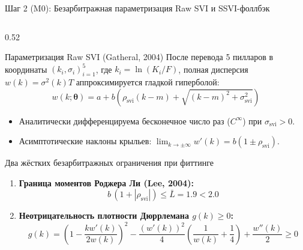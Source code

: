 \documentclass[aspectratio=169, 9pt]{beamer}
\begin{document}
\begin{frame}{Шаг 2 (M0): Безарбитражная параметризация Raw SVI и SSVI-фоллбэк}
  \begin{columns}[T]
    \begin{column}{0.52\textwidth}
      \begin{block}{Параметризация Raw SVI (Gatheral, 2004)}
        После перевода 5 пилларов в координаты $(k_i, \sigma_i)_{i=1}^5$, где $k_i = \ln(K_i / F)$, полная дисперсия $w(k) = \sigma^2(k)T$ аппроксимируется гладкой гиперболой:
        $$w(k; \bm{\theta}) = a + b\!\left(\rho_{\text{svi}}(k - m) + \sqrt{(k - m)^2 + \sigma_{\text{svi}}^2}\right)$$
        \begin{itemize}
          \item Аналитически дифференцируема бесконечное число раз ($C^\infty$) при $\sigma_{\text{svi}} > 0$.
          \item Асимптотические наклоны крыльев: $\lim_{k\to\pm\infty} w'(k) = b(1 \pm \rho_{\text{svi}})$.
        \end{itemize}
      \end{block}

      \begin{block}{Два жёстких безарбитражных ограничения при фиттинге}
        \begin{enumerate}
          \item \textbf{Граница моментов Роджера Ли (Lee, 2004):}
            $$b\,(1 + |\rho_{\text{svi}}|) \le \bar{L} = 1.9 < 2.0$$
          \item \textbf{Неотрицательность плотности Дюррлемана $g(k) \ge 0$:}
            $$g(k) = \left(1 - \frac{k w'(k)}{2w(k)}\right)^{\!2} - \frac{(w'(k))^2}{4}\!\left(\frac{1}{w(k)} + \frac{1}{4}\right) + \frac{w''(k)}{2} \ge 0$$
        \end{enumerate}
      \end{block}
    \end{column}


\end{columns}
\end{frame}
\end{document}
